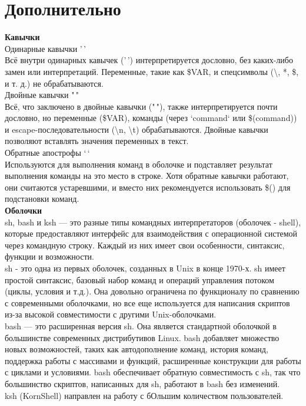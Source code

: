 \section{Дополнительно}
\noindent \textbf{Кавычки} \\
Одинарные кавычки '\,' \\
Всё внутри одинарных кавычек ('\,') интерпретируется дословно, без каких-либо замен или интерпретаций. Переменные, такие как \$VAR, и спецсимволы (\textbackslash, *, \$, и т. д.) не обрабатываются. \\
Двойные кавычки "\,"  \\
Всё, что заключено в двойные кавычки ("\,"), также интерпретируется почти дословно, но переменные (\$VAR), команды (через `command` или \$(command)) и escape-последовательности (\textbackslash n, \textbackslash t) обрабатываются. Двойные кавычки позволяют вставлять значения переменных в текст. \\
Обратные апострофы `\,` \\
Используются для выполнения команд в оболочке и подставляет результат выполнения команды на это место в строке. Хотя обратные кавычки работают, они считаются устаревшими, и вместо них рекомендуется использовать \$() для подстановки команд. \\

\noindent \textbf{Оболочки} \\
sh, bash и ksh — это разные типы командных интерпретаторов (оболочек - shell), которые предоставляют интерфейс для взаимодействия с операционной системой через командную строку. Каждый из них имеет свои особенности, синтаксис, функции и возможности. \\
sh - это одна из первых оболочек, созданных в Unix в конце 1970-х. sh имеет простой синтаксис, базовый набор команд и операций управления потоком (циклы, условия и т.д.). Она довольно ограничена по функционалу по сравнению с современными оболочками, но все еще используется для написания скриптов из-за высокой совместимости с другими Unix-оболочками. \\
bash — это расширенная версия sh. Она является стандартной оболочкой в большинстве современных дистрибутивов Linux. bash добавляет множество новых возможностей, таких как автодополнение команд, история команд, поддержка работы с массивами и функций, расширенные конструкции для работы с циклами и условиями. bash обеспечивает обратную совместимость с sh, так что большинство скриптов, написанных для sh, работают в bash без изменений. \\
ksh (KornShell) направлен на работу с бОльшим количеством пользователей. \\

